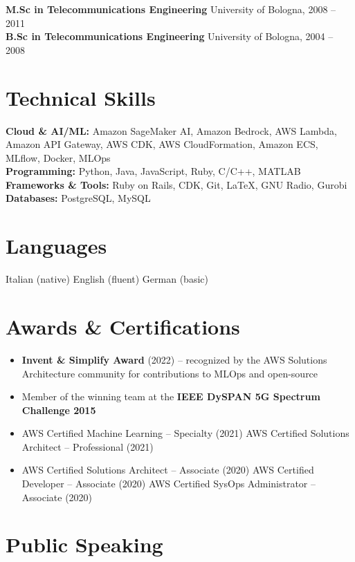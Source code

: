 \documentclass[11pt,a4paper]{article}
\begin{document}
\medskip
\textbf{M.Sc in Telecommunications Engineering} \hfill University of Bologna, 2008 -- 2011\\
\textbf{B.Sc in Telecommunications Engineering} \hfill University of Bologna, 2004 -- 2008

\section{Technical Skills}

\textbf{Cloud \& AI/ML:} Amazon SageMaker AI, Amazon Bedrock, AWS Lambda, Amazon API Gateway, AWS CDK, AWS CloudFormation, Amazon ECS, MLflow, Docker, MLOps\\
\textbf{Programming:} Python, Java, JavaScript, Ruby, C/C++, MATLAB\\
\textbf{Frameworks \& Tools:} Ruby on Rails, CDK, Git, LaTeX, GNU Radio, Gurobi\\
\textbf{Databases:} PostgreSQL, MySQL

\section{Languages}

Italian (native) \quad English (fluent) \quad German (basic)

\section{Awards \& Certifications}

\begin{itemize}[nosep,leftmargin=*]
\item \textbf{Invent \& Simplify Award} (2022) -- recognized by the AWS Solutions Architecture community for contributions to MLOps and open-source
\item Member of the winning team at the \textbf{IEEE DySPAN 5G Spectrum Challenge 2015}
\item AWS Certified Machine Learning -- Specialty (2021) \quad AWS Certified Solutions Architect -- Professional (2021)
\item AWS Certified Solutions Architect -- Associate (2020) \quad AWS Certified Developer -- Associate (2020) \quad AWS Certified SysOps Administrator -- Associate (2020)
\end{itemize}

\section{Public Speaking}
\end{document}

